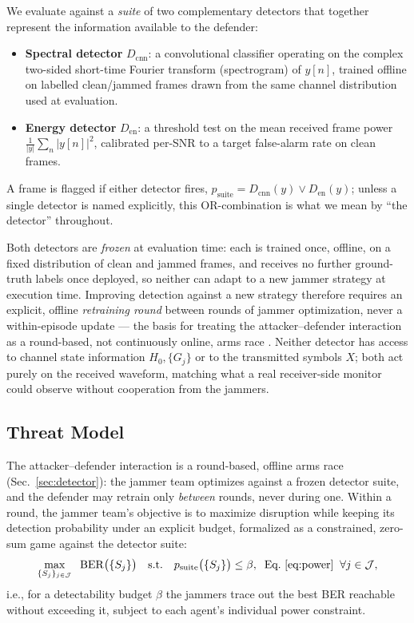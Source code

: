 \documentclass[journal]{IEEEtran}
\newcommand{\rar}[1]{{\color{blue}{[#1]}}}
\begin{document}
We evaluate against a \emph{suite} of two complementary detectors that
together represent the information available to the defender:
\begin{itemize}
    \item \textbf{Spectral detector} $D_{\mathrm{cnn}}$: a convolutional
    classifier operating on the complex two-sided short-time Fourier
    transform (spectrogram) of $y[n]$, trained offline on labelled
    clean/jammed frames drawn from the same channel distribution used at
    evaluation.
    \item \textbf{Energy detector} $D_{\mathrm{en}}$: a threshold test on the
    mean received frame power $\frac{1}{|y|}\sum_n |y[n]|^2$, calibrated
    per-SNR to a target false-alarm rate on clean frames.
\end{itemize}
A frame is flagged if either detector fires,
$p_{\mathrm{suite}} = D_{\mathrm{cnn}}(y) \vee D_{\mathrm{en}}(y)$; unless a
single detector is named explicitly, this OR-combination is what we mean by
``the detector'' throughout.

Both detectors are \emph{frozen} at evaluation time: each is trained once,
offline, on a fixed distribution of clean and jammed frames, and receives no
further ground-truth labels once deployed, so neither can adapt to a new
jammer strategy at execution time. Improving detection against a new
strategy therefore requires an explicit, offline \emph{retraining round}
between rounds of jammer optimization, never a within-episode update — the
basis for treating the attacker--defender interaction as a round-based, not
continuously online, arms race \rar{cross-ref the adaptation-cost round
protocol once it has a section}. Neither detector has access to channel
state information $H_0,\{G_j\}$ or to the transmitted symbols $X$; both act
purely on the received waveform, matching what a real receiver-side monitor
could observe without cooperation from the jammers.

\subsection{Threat Model}
The attacker--defender interaction is a round-based, offline arms race
(Sec.~\ref{sec:detector}): the jammer team optimizes against a frozen
detector suite, and the defender may retrain only \emph{between} rounds,
never during one. Within a round, the jammer team's objective is to maximize
disruption while keeping its detection probability under an explicit budget,
formalized as a constrained, zero-sum game against the detector suite:
\begin{equation}
\max_{\{S_j\}_{j\in\mathcal J}} \;\; \mathrm{BER}\big(\{S_j\}\big)
\quad \text{s.t.} \quad p_{\mathrm{suite}}\big(\{S_j\}\big) \le \beta,
\;\; \text{Eq.~\eqref{eq:power}} \;\; \forall j \in \mathcal{J},
\label{eq:objective}
\end{equation}
i.e., for a detectability budget $\beta$ the jammers trace out the best BER
reachable without exceeding it, subject to each agent's individual power
constraint. \rar{state the defender's symmetric objective once the
retraining-round protocol (R0/R1/R2) has a home section.}
\end{document}
